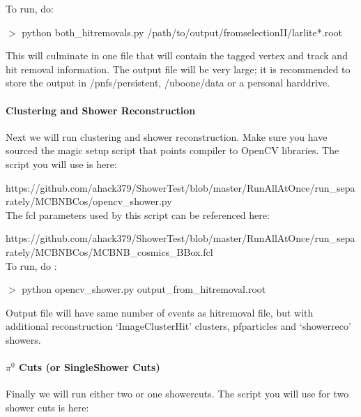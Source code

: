 \documentclass{article}
\begin{document}
\noindent To run, do:
\par $>$ python both\_hitremovals.py /path/to/output/fromselectionII/larlite*.root

\noindent This will culminate in one file that will contain the tagged vertex and track and hit removal information.  The output file will be very large; it is recommended to store the output in /pnfs/persistent, /uboone/data or a personal harddrive.  




\paragraph{Clustering and Shower Reconstruction}
Next we will run clustering and shower reconstruction. Make sure you have sourced the magic setup script that points compiler to OpenCV libraries. The script you will use is here:

\noindent https://github.com/ahack379/ShowerTest/blob/master/RunAllAtOnce/run\_separately/MCBNBCos/opencv\_shower.py\\

\noindent The fcl parameters used by this script can be referenced here:

\noindent
https://github.com/ahack379/ShowerTest/blob/master/RunAllAtOnce/run\_separately/MCBNBCos/MCBNB\_cosmics\_BBox.fcl\\

\noindent To run, do :
\par $>$ python opencv\_shower.py output\_from\_hitremoval.root

\noindent Output file will have same number of events as hitremoval file, but with additional reconstruction `ImageClusterHit' clusters, pfparticles and `showerreco' showers.  

\paragraph{$\pi^0$ Cuts (or SingleShower Cuts)}
Finally we will run either two or one showercuts. The script you will use for two shower cuts is here:
\end{document}
